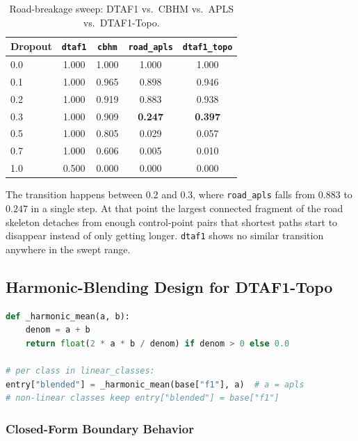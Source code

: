 \begin{table}
  \caption{Road-breakage sweep: DTAF1 vs.\ CBHM vs.\ APLS vs.\ DTAF1-Topo.}
  \label{tab:breakage-topo}
  \begin{tabular}{@{}lcccc@{}}
    \toprule
    Dropout & \texttt{dtaf1} & \texttt{cbhm} & \texttt{road\_apls} & \texttt{dtaf1\_topo} \\
    \midrule
    0.0 & 1.000 & 1.000 & 1.000 & 1.000 \\
    0.1 & 1.000 & 0.965 & 0.898 & 0.946 \\
    0.2 & 1.000 & 0.919 & 0.883 & 0.938 \\
    0.3 & 1.000 & 0.909 & \textbf{0.247} & \textbf{0.397} \\
    0.5 & 1.000 & 0.805 & 0.029 & 0.057 \\
    0.7 & 1.000 & 0.606 & 0.005 & 0.010 \\
    1.0 & 0.500 & 0.000 & 0.000 & 0.000 \\
    \bottomrule
  \end{tabular}
\end{table}

The transition happens between 0.2 and 0.3, where \texttt{road\_apls} falls from $0.883$ to $0.247$
in a single step. At that point the largest connected fragment of the road skeleton detaches from
enough control-point pairs that shortest paths start to disappear instead of only getting longer.
\texttt{dtaf1} shows no similar transition anywhere in the swept range.

\subsection{Harmonic-Blending Design for DTAF1-Topo}
\label{subsec:dtaf1topo}

\begin{lstlisting}[language=Python, caption={Blending primitive, \texttt{metrics/dtaf1\_topo.py:29-31,74-87}}]
def _harmonic_mean(a, b):
    denom = a + b
    return float(2 * a * b / denom) if denom > 0 else 0.0

# per class in linear_classes:
entry["blended"] = _harmonic_mean(base["f1"], a)  # a = apls
# non-linear classes keep entry["blended"] = base["f1"]
\end{lstlisting}

\subsubsection{Closed-Form Boundary Behavior}

